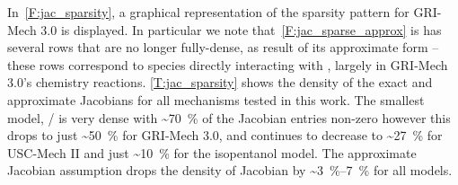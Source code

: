 \documentclass[12pt,number,sort&compress,preprint]{elsarticle}
\begin{document}
In~\cref{F:jac_sparsity}, a graphical representation of the sparsity pattern for GRI-Mech 3.0 is displayed.
In particular we note that~\cref{F:jac_sparse_approx} is has several rows that are no longer fully-dense, as result of its approximate form -- these rows correspond to species directly interacting with , largely in GRI-Mech 3.0's  chemistry reactions.
\cref{T:jac_sparsity} shows the density of the exact and approximate Jacobians for all mechanisms tested in this work.
The smallest model, \slash{} is very dense with \textasciitilde\SI{70}{\percent} of the Jacobian entries non-zero however this drops to just \textasciitilde\SI{50}{\percent} for GRI-Mech 3.0, and continues to decrease to \textasciitilde\SI{27}{\percent} for USC-Mech II and just \textasciitilde\SI{10}{\percent} for the isopentanol model.
The approximate Jacobian assumption drops the density of Jacobian by \textasciitilde\SIrange{3}{7}{\percent} for all models.
\end{document}

